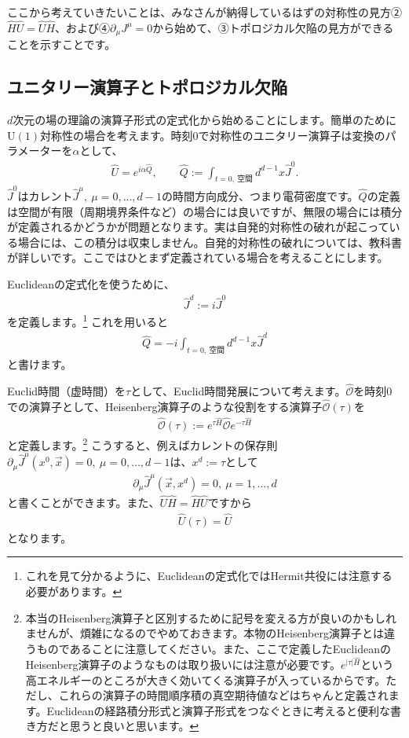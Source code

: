 \documentclass[report,paper=a4, fontsize=12pt, line_length=16cm, number_of_lines=33,dvipdfmx]{jlreq}
\numberwithin{equation}{chapter}
\newcommand{\del}{\partial}
\newcommand{\Hh}{\widehat{H}}
\newcommand{\Uh}{\widehat{U}}
\newcommand{\Jh}{\widehat{J}}
\newcommand{\Qh}{\widehat{Q}}
\newcommand{\Oh}{\widehat{\mathcal{O}}}
\newcommand{\U}{\mbox{U}}
\begin{document}
ここから考えていきたいことは、みなさんが納得しているはずの対称性の見方②$\Hh \Uh = \Uh \Hh$、および④$\del_{\mu}J^{\mu}=0$から始めて、③トポロジカル欠陥の見方ができることを示すことです。

\subsection{ユニタリー演算子とトポロジカル欠陥}

$d$次元の場の理論の演算子形式の定式化から始めることにします。簡単のために$\U (1)$対称性の場合を考えます。時刻$0$で対称性のユニタリー演算子は変換のパラメーターを$\alpha$として、
\begin{align}
  \Uh=e^{i\alpha \Qh},\qquad
  \Qh:=\int_{t=0,\ \text{空間}}d^{d-1}x \Jh^0. 
\end{align}
$\Jh^{0}$はカレント$\Jh^{\mu},\ \mu=0,\dots,d-1$の時間方向成分、つまり電荷密度です。$\Qh$の定義は空間が有限（周期境界条件など）の場合には良いですが、無限の場合には積分が定義されるかどうかが問題となります。実は自発的対称性の破れが起こっている場合には、この積分は収束しません。自発的対称性の破れについては、教科書\cite{Kugo2}が詳しいです。ここではひとまず定義されている場合を考えることにします。

Euclideanの定式化を使うために、
\begin{align}
  \Jh^{d}:=i\Jh^{0}
\end{align}
を定義します。\footnote{これを見て分かるように、Euclideanの定式化ではHermit共役には注意する必要があります。} これを用いると
\begin{align}
  \Qh = -i \int_{t=0,\ \text{空間}}d^{d-1}x \Jh^{d}
\end{align}
と書けます。

Euclid時間（虚時間）を$\tau$として、Euclid時間発展について考えます。$\Oh$を時刻$0$での演算子として、Heisenberg演算子のような役割をする演算子$\Oh(\tau)$を
\begin{align}
  \Oh(\tau):=e^{\tau \Hh}\Oh e^{-\tau \Hh}
\end{align}
と定義します。\footnote{本当のHeisenberg演算子と区別するために記号を変える方が良いのかもしれませんが、煩雑になるのでやめておきます。本物のHeisenberg演算子とは違うものであることに注意してください。また、ここで定義したEuclideanのHeisenberg演算子のようなものは取り扱いには注意が必要です。$e^{|\tau| \Hh}$という高エネルギーのところが大きく効いてくる演算子が入っているからです。ただし、これらの演算子の時間順序積の真空期待値などはちゃんと定義されます。Euclideanの経路積分形式と演算子形式をつなぐときに考えると便利な書き方だと思うと良いと思います。} こうすると、例えばカレントの保存則$\del_{\mu}\Jh^{\mu}(x^0,\vec{x})=0,\ \mu=0,\dots, d-1$は、$x^d:=\tau$として
\begin{align}
  \del_{\mu}\Jh^{\mu}(\vec{x},x^{d})=0,\ \mu=1,\dots,d
\end{align}
と書くことができます。また、$\Uh \Hh = \Hh \Uh$ですから
\begin{align}
  \Uh(\tau)=\Uh
  \label{conservation}
\end{align}
となります。
\end{document}
